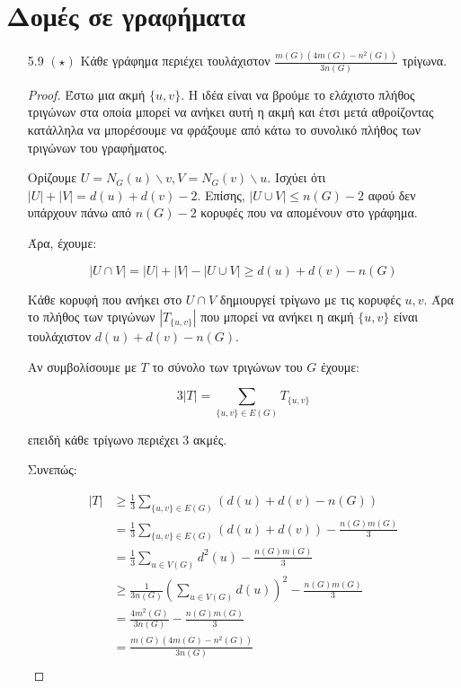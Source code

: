 \documentclass[a4paper, oneside, 11pt]{article}
\theoremstyle{definition}
\begin{document}
\section{Δομές σε γραφήματα}

\begin{enumerate}
   \item[5.9 $(\star)$]
      Κάθε γράφημα περιέχει τουλάχιστον $\frac{m(G)(4m(G) - n^2(G))}{3n(G)}$
      τρίγωνα.

      \begin{proof}

      Έστω μια ακμή $\{u, v\}$. Η ιδέα είναι να βρούμε το ελάχιστο πλήθος
      τριγώνων στα οποία μπορεί να ανήκει αυτή η ακμή και έτσι μετά αθροίζοντας
      κατάλληλα να μπορέσουμε να φράξουμε από κάτω το συνολικό πλήθος των
      τριγώνων του γραφήματος.

      Ορίζουμε $U = N_G(u) \backslash v,
      V = N_G(v) \backslash u$. Ισχύει ότι $|U| + |V| = d(u) + d(v) - 2$.
      Επίσης, $|U \cup V| \leq n(G) - 2$ αφού δεν υπάρχουν πάνω από
      $n(G)-2$ κορυφές που να απομένουν στο γράφημα.

      Άρα, έχουμε:

      \[ |U \cap V| = |U| + |V| - |U \cup V| \geq d(u) + d(v) - n(G) \]

      Κάθε κορυφή που ανήκει στο $U \cap V$ δημιουργεί τρίγωνο με τις
      κορυφές $u, v$. Άρα το πλήθος των τριγώνων $|T_{\{u, v\}}|$ που μπορεί
      να ανήκει
      η ακμή $\{u, v\}$ είναι τουλάχιστον $d(u) + d(v) - n(G)$.

      Αν συμβολίσουμε με $T$ το σύνολο των τριγώνων του $G$ έχουμε:

      \[ 3|T| = \sum_{\{u, v\} \in E(G)} T_{\{u, v\}} \]

      επειδή κάθε τρίγωνο περιέχει 3 ακμές.

      Συνεπώς:

      \begin{align*}
         |T| &\geq \frac13 \sum_{\{u, v\} \in E(G)} ( d(u) + d(v) - n(G) )\\
             &= \frac13 \sum_{\{u, v\} \in E(G)} ( d(u) + d(v) ) -
                \frac{n(G)m(G)}3 \\
             &= \frac13 \sum_{u \in V(G)} d^2(u) - \frac{n(G)m(G)}3\\
             &\geq \frac1{3n(G)} \left( \sum_{u \in V(G)} d(u) \right)^2
                 - \frac{n(G)m(G)}3\\
             &= \frac{4m^2(G)}{3n(G)} - \frac{n(G)m(G)}3\\
             &= \frac{m(G)(4m(G) - n^2(G))}{3n(G)}\\
      \end{align*}


\end{proof}
\end{enumerate}
\end{document}
